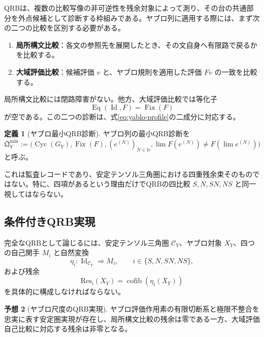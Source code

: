 \documentclass[a4paper,11pt]{ltjsarticle}
\theoremstyle{definition}
\newtheorem{definition}{定義}[section]
\newtheorem{conjecture}[definition]{予想}
\theoremstyle{plain}
\newcommand{\Fix}{\operatorname{Fix}}
\newcommand{\Cyc}{\operatorname{Cyc}}
\newcommand{\Res}{\mathrm{Res}}
\newcommand{\cofib}{\operatorname{cofib}}
\newcommand{\Id}{\operatorname{Id}}
\newcommand{\N}{\mathbb N}
\begin{document}
QRBは、複数の比較写像の非可逆性を残余対象によって測り、その台の共通部分を外点候補として診断する枠組みである\cite{ChibaQRB2026}。ヤブロ列に適用する際には、まず次の二つの比較を区別する必要がある。
\begin{enumerate}
 \item \textbf{局所構文比較}：各文の参照先を展開したとき、その文自身へ有限路で戻るかを比較する。
 \item \textbf{大域評価比較}：候補評価 $v$ と、ヤブロ規則を適用した評価 $Fv$ の一致を比較する。
\end{enumerate}

局所構文比較には閉路障害がない。他方、大域評価比較では等化子
\begin{equation}
 \operatorname{Eq}(\Id,F)=\Fix(F)
\end{equation}
が空である。この二つの診断は、式\eqref{eq:yablo-profile}の二成分に対応する。

\begin{definition}[ヤブロ最小QRB診断]
ヤブロ列の最小QRB診断を
\begin{equation}
 \mathfrak Q_Y^{\min}
 :=
 \bigl(
  \Cyc(G_Y),
  \Fix(F),
  (e^{(N)})_{N\in\N},
  \lim F(e^{(N)})\neq F(\lim e^{(N)})
 \bigr)
 \label{eq:minimal-qrb}
\end{equation}
と呼ぶ。
\end{definition}

これは監査レコードであり、安定テンソル三角圏における四重残余束そのものではない。特に、四項があるという理由だけでQRBの四比較 $S,N,SN,NS$ と同一視してはならない。

\subsection{条件付きQRB実現}

完全なQRBとして論じるには、安定テンソル三角圏 $\mathcal C_Y$、ヤブロ対象 $X_Y$、四つの自己関手 $M_i$ と自然変換
\begin{equation}
 \eta_i:\Id_{\mathcal C_Y}\Longrightarrow M_i,
 \qquad i\in\{S,N,SN,NS\},
\end{equation}
および残余
\begin{equation}
 \Res_i(X_Y)=\cofib(\eta_i(X_Y))
\end{equation}
を具体的に構成しなければならない。

\begin{conjecture}[ヤブロ尺度のQRB実現]
ヤブロ評価作用素の有限切断系と極限不整合を忠実に表す安定圏実現が存在し、局所構文比較の残余は零である一方、大域評価自己比較に対応する残余は非零となる。
\end{conjecture}
\end{document}
